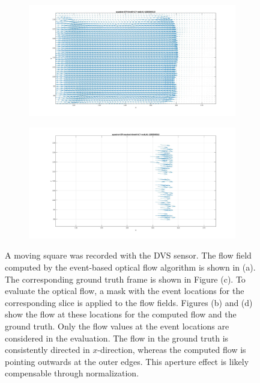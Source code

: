 \begin{figure}[tb]
\begin{subfigure}{.45\textwidth}
  \caption{}
  \label{fig:qaudrat-close-masking-2}
\end{subfigure}
\begin{subfigure}{.45\textwidth}
  \centering
  \includegraphics[height=.6\linewidth]{figs/quadrat_close_GT.jpg}
  \caption{}
  \label{fig:qaudrat-close-masking-3}
\end{subfigure}
\begin{subfigure}{.45\textwidth}
  \centering
  \includegraphics[height=.6\linewidth]{figs/quadrat_close_GT_masked.jpg}
  \caption{}
  \label{fig:qaudrat-close-masking-4}
\end{subfigure}
\caption[First scene: Square moving to the right.]{A moving square was recorded with the DVS sensor.
The flow field computed by the event-based optical flow algorithm is shown in (a).
The corresponding ground truth frame is shown in Figure (c).
To evaluate the optical flow, a mask with the event locations for the corresponding slice is applied to the flow fields.
Figures (b) and (d) show the flow at these locations for the computed flow and the ground truth.
Only the flow values at the event locations are considered in the evaluation.
The flow in the ground truth is consistently directed in $x$-direction, whereas the computed flow is pointing outwards at the outer edges. This aperture effect is likely compensable through normalization.}
\label{fig:qaudrat-close-masking}
\end{figure}

